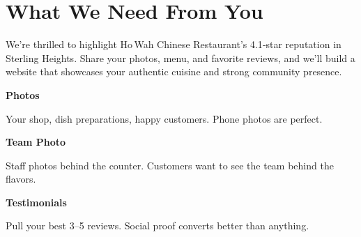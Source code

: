 \documentclass[11pt,letterpaper]{article}
\begin{document}
\vspace{0.2em}

\section*{What We Need From You}

We’re thrilled to highlight Ho Wah Chinese Restaurant’s 4.1‑star reputation in Sterling Heights. Share your photos, menu, and favorite reviews, and we’ll build a website that showcases your authentic cuisine and strong community presence.

\vspace{0.12em}

\noindent\begin{minipage}[t]{0.48\textwidth}
\begin{tcolorbox}[colframe=accent-teal, boxrule=1pt, left=0.7em, right=0.7em, top=0.5em, bottom=0.5em, arc=4pt, boxsep=0pt]
{\bfseries\small\color{accent-teal}Photos}

\vspace{0.15em}

{\small Your shop, dish preparations, happy customers. Phone photos are perfect.}
\end{tcolorbox}

\vspace{0.1em}

\begin{tcolorbox}[colframe=accent-teal, boxrule=1pt, left=0.7em, right=0.7em, top=0.5em, bottom=0.5em, arc=4pt, boxsep=0pt]
{\bfseries\small\color{accent-teal}Team Photo}

\vspace{0.15em}

{\small Staff photos behind the counter. Customers want to see the team behind the flavors.}
\end{tcolorbox}

\vspace{0.1em}

\begin{tcolorbox}[colframe=accent-teal, boxrule=1pt, left=0.7em, right=0.7em, top=0.5em, bottom=0.5em, arc=4pt, boxsep=0pt]
{\bfseries\small\color{accent-teal}Testimonials}

\vspace{0.15em}

{\small Pull your best 3--5 reviews. Social proof converts better than anything.}
\end{tcolorbox}
\end{minipage}
\hfill
\end{document}
